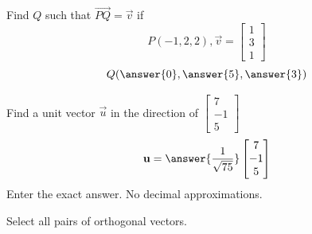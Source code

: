 \documentclass{ximera}
\begin{document}
\begin{exercise}
Find $Q$ such that $\overrightarrow{PQ}=\vec{v}$ if
$$P(-1, 2, 2), \vec{v}=\begin{bmatrix}1\\3\\1\end{bmatrix}$$
$$Q(\answer{0},\answer{5},\answer{3})$$
\end{exercise}

\begin{exercise}
Find a unit vector $\vec{u}$ in the direction of $\begin{bmatrix}7\\-1\\5\end{bmatrix}$
$$\vec{u}=\answer{\frac{1}{\sqrt{75}}}\begin{bmatrix}7\\-1\\5\end{bmatrix}$$
Enter the exact answer.  No decimal approximations.
\end{exercise}

\begin{exercise}
Select all pairs of orthogonal vectors.
 
\begin{selectAll}
 \end{selectAll}
\end{exercise}
\end{document}
